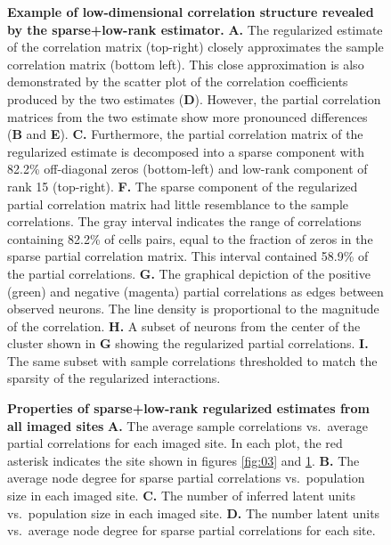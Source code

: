 \documentclass[10pt]{article}
\begin{document}
\begin{figure}[!ht]
    \begin{center}
    \end{center}
    \caption{{\bf Example of low-dimensional correlation structure revealed by the sparse+low-rank estimator.}
    {\bf A.} The regularized estimate of the correlation matrix (top-right) closely approximates the sample correlation matrix (bottom left). 
    This close approximation is  also demonstrated by the scatter plot of the correlation coefficients produced by the two estimates ({\bf D}). 
    However, the partial correlation matrices from the two estimate show more pronounced differences ({\bf B} and {\bf E}). 
    {\bf C.} Furthermore, the partial correlation matrix of the regularized estimate is decomposed into a sparse component with 82.2\% off-diagonal zeros (bottom-left) and low-rank component of rank 15 (top-right).
    {\bf F.} The sparse component of the regularized partial correlation matrix had little resemblance to the sample correlations. The gray interval indicates the range of correlations containing 82.2\% of cells pairs, equal to the fraction of zeros in the sparse partial correlation matrix. This interval contained 58.9\% of the partial correlations. 
    {\bf G.} The graphical depiction of the positive (green) and negative (magenta) partial correlations as edges between observed neurons. The line density is proportional to the magnitude of the correlation.
    {\bf H.} A subset of neurons from the center of the cluster shown in {\bf G} showing the regularized partial correlations.
    {\bf I.} The same subset with sample correlations thresholded to match the sparsity of the regularized interactions.
}
\label{fig:05}
\end{figure}

\begin{figure}[!ht]
    \begin{center}
    \end{center}
    \caption{{\bf Properties of sparse+low-rank regularized estimates from all imaged sites}
    {\bf A.} The average sample correlations vs.~average partial correlations for each imaged site. In each plot, the red asterisk indicates the site shown in figures \ref{fig:03} and \ref{fig:05}.
    {\bf B.} The average node degree for sparse partial correlations vs.~population size in each imaged site. 
    {\bf C.} The number of inferred latent units vs.~population size in each imaged site.
    {\bf D.} The number latent units vs.~average node degree for sparse partial correlations for each site.
}
\label{fig:06}
\end{figure}
\end{document}
